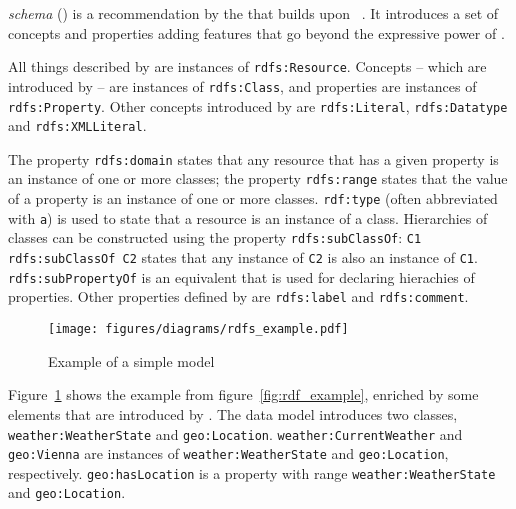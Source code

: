 \vspace{1em}

 \emph{schema} () is a recommendation by the  that builds upon ~\cite{RDFS}. It introduces a set of concepts and properties adding features that go beyond the expressive power of .

All things described by  are instances of \texttt{rdfs:Resource}. Concepts -- which are introduced by  -- are instances of \texttt{rdfs:Class}, and properties are instances of \texttt{rdfs:\hspace{0pt}Property}. Other concepts introduced by  are \texttt{rdfs:\hspace{0pt}Literal}, \texttt{rdfs:\hspace{0pt}Datatype} and \texttt{rdfs:\hspace{0pt}XMLLiteral}.

The property \texttt{rdfs:domain} states that any resource that has a given property is an instance of one or more classes; the property \texttt{rdfs:range} states that the value of a property is an instance of one or more classes. \texttt{rdf:type} (often abbreviated with \texttt{a}) is used to state that a resource is an instance of a class. Hierarchies of classes can be constructed using the property \texttt{rdfs:subClassOf}: \texttt{C1 rdfs:subClassOf C2} states that any instance of \texttt{C2} is also an instance of \texttt{C1}. \texttt{rdfs:subPropertyOf} is an equivalent that is used for declaring hierachies of properties. Other properties defined by  are \texttt{rdfs:label} and \texttt{rdfs:comment}.

\begin{figure}
\centering
\texttt{[image: figures/diagrams/rdfs\_example.pdf]}
\caption{Example of a simple  model}
\label{fig:rdfs_example}
\end{figure}

Figure~\ref{fig:rdfs_example} shows the example from figure~\ref{fig:rdf_example}, enriched by some elements that are introduced by . The data model introduces two classes, \texttt{weather:\hspace{0pt}Weather\hspace{0pt}State} and \texttt{geo:\hspace{0pt}Location}. \texttt{weather:\hspace{0pt}CurrentWeather} and \texttt{geo:\hspace{0pt}Vienna} are instances of \texttt{weather:\hspace{0pt}Weather\hspace{0pt}State} and \texttt{geo:\hspace{0pt}Location}, respectively. \texttt{geo:\hspace{0pt}has\hspace{0pt}Location} is a property with range \texttt{weather:\hspace{0pt}Weather\hspace{0pt}State} and \texttt{geo:\hspace{0pt}Location}.

